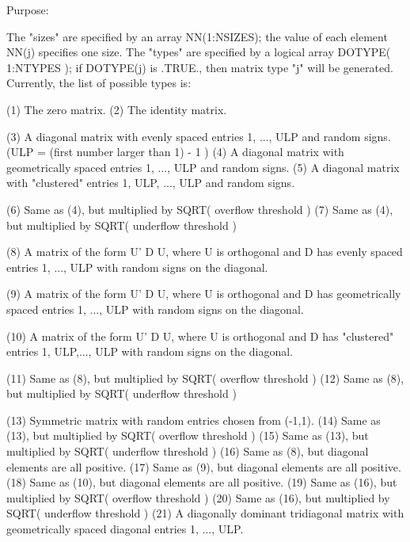 \begin{DoxyParagraph}{Purpose\+: }
\begin{DoxyVerb}
 The "sizes" are specified by an array NN(1:NSIZES); the value of
 each element NN(j) specifies one size.
 The "types" are specified by a logical array DOTYPE( 1:NTYPES );
 if DOTYPE(j) is .TRUE., then matrix type "j" will be generated.
 Currently, the list of possible types is:

 (1)  The zero matrix.
 (2)  The identity matrix.

 (3)  A diagonal matrix with evenly spaced entries
      1, ..., ULP  and random signs.
      (ULP = (first number larger than 1) - 1 )
 (4)  A diagonal matrix with geometrically spaced entries
      1, ..., ULP  and random signs.
 (5)  A diagonal matrix with "clustered" entries 1, ULP, ..., ULP
      and random signs.

 (6)  Same as (4), but multiplied by SQRT( overflow threshold )
 (7)  Same as (4), but multiplied by SQRT( underflow threshold )

 (8)  A matrix of the form  U' D U, where U is orthogonal and
      D has evenly spaced entries 1, ..., ULP with random signs
      on the diagonal.

 (9)  A matrix of the form  U' D U, where U is orthogonal and
      D has geometrically spaced entries 1, ..., ULP with random
      signs on the diagonal.

 (10) A matrix of the form  U' D U, where U is orthogonal and
      D has "clustered" entries 1, ULP,..., ULP with random
      signs on the diagonal.

 (11) Same as (8), but multiplied by SQRT( overflow threshold )
 (12) Same as (8), but multiplied by SQRT( underflow threshold )

 (13) Symmetric matrix with random entries chosen from (-1,1).
 (14) Same as (13), but multiplied by SQRT( overflow threshold )
 (15) Same as (13), but multiplied by SQRT( underflow threshold )
 (16) Same as (8), but diagonal elements are all positive.
 (17) Same as (9), but diagonal elements are all positive.
 (18) Same as (10), but diagonal elements are all positive.
 (19) Same as (16), but multiplied by SQRT( overflow threshold )
 (20) Same as (16), but multiplied by SQRT( underflow threshold )
 (21) A diagonally dominant tridiagonal matrix with geometrically
      spaced diagonal entries 1, ..., ULP.\end{DoxyVerb}
 
\end{DoxyParagraph}

